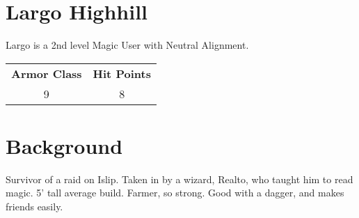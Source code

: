 \documentclass[a4paper]{article}
\begin{document}
\begin{multicols}{2}
\section{Largo Highhill}
Largo is a 2nd level Magic User with Neutral Alignment.
  \begin{table}[H]
    \begin{tabular}{c|c} %
      \textbf{Armor Class} & \textbf{Hit Points}\\
      9 & 8\\
    \end{tabular}
  \end{table}
\columnbreak

\section{Background}
Survivor of a raid on Islip.  Taken in by a wizard, Realto, who taught him to read magic. 5' tall
average build.  Farmer, so strong.  Good with a dagger, and makes friends easily.

\end{multicols}

\hrulefill
\end{document}
